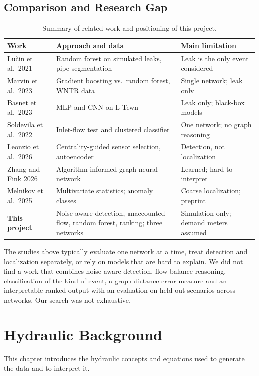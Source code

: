 \documentclass[11pt,letterpaper]{report}
\theoremstyle{definition}
\theoremstyle{plain}
\theoremstyle{remark}
\begin{document}
\section{Comparison and Research Gap}
\begin{table}[H]
\centering\small
\caption{Summary of related work and positioning of this project.}\label{tab:related}
\begin{tabularx}{\textwidth}{@{}p{1.1in}YY@{}}
\toprule
Work & Approach and data & Main limitation \\
\midrule
Lu\v{c}in et al.\ 2021 \cite{lucin2021rf} & Random forest on simulated leaks, pipe segmentation & Leak is the only event considered \\
Marvin et al.\ 2023 \cite{marvin2023hgb} & Gradient boosting vs.\ random forest, WNTR data & Single network; leak only \\
Basnet et al.\ 2023 \cite{basnet2023supervised} & MLP and CNN on L-Town & Leak only; black-box models \\
Soldevila et al.\ 2022 \cite{soldevila2022hybrid} & Inlet-flow test and clustered classifier & One network; no graph reasoning \\
Leonzio et al.\ 2026 \cite{leonzio2026centrality} & Centrality-guided sensor selection, autoencoder & Detection, not localization \\
Zhang and Fink 2026 \cite{zhang2026aignn} & Algorithm-informed graph neural network & Learned; hard to interpret \\
Melnikov et al.\ 2025 \cite{melnikov2025sicams} & Multivariate statistics; anomaly classes & Coarse localization; preprint \\
\textbf{This project} & Noise-aware detection, unaccounted flow, random forest, ranking; three networks & Simulation only; demand meters assumed \\
\bottomrule
\end{tabularx}
\end{table}
The studies above typically evaluate one network at a time, treat detection and localization separately, or rely on models that are hard to explain. We did not find a work that combines noise-aware detection, flow-balance reasoning, classification of the kind of event, a graph-distance error measure and an interpretable ranked output with an evaluation on held-out scenarios across networks. Our search was not exhaustive.

\chapter{Hydraulic Background}
This chapter introduces the hydraulic concepts and equations used to generate the data and to interpret it.
\end{document}
